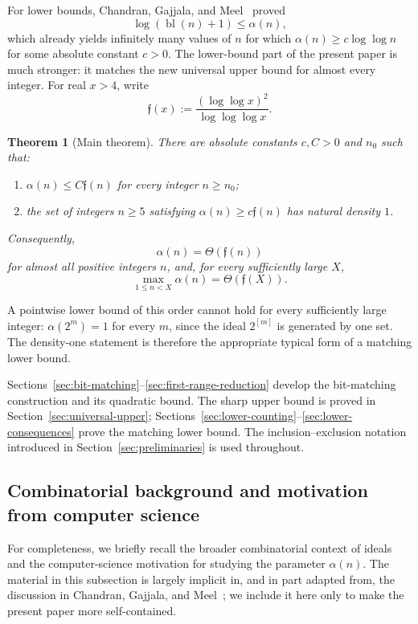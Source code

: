 \documentclass[11pt]{article}
\newtheorem{theorem}{Theorem}[section]
\theoremstyle{definition}
\theoremstyle{remark}
\newcommand{\growth}[1]{\mathfrak f(#1)}
\begin{document}
For lower bounds, Chandran, Gajjala, and Meel~\cite{ChandranGajjalaMeel26} proved
\[
  \log(\operatorname{bl}(n)+1)\le\alpha(n),
\]
which already yields infinitely many values of $n$ for which $\alpha(n)\ge c\log\log n$ for some absolute constant $c>0$.
The lower-bound part of the present paper is much stronger: it matches the new universal upper bound for almost every integer.
For real $x>4$, write
\begin{equation}
  \growth{x}:=\frac{(\log\log x)^2}{\log\log\log x}.
  \label{eq:growth-function}
\end{equation}

\begin{theorem}[Main theorem]\label{thm:main}
There are absolute constants $c,C>0$ and $n_0$ such that:
\begin{enumerate}[label=\textup{(\roman*)}]
  \item $\alpha(n)\le C\growth{n}$ for every integer $n\ge n_0$;
    \item the set of integers $n\ge5$ satisfying $\alpha(n)\ge c\growth{n}$ has natural density $1$.
\end{enumerate}
Consequently,
\[
  \alpha(n)=\Theta(\growth{n})
\]
for almost all positive integers $n$, and, for every sufficiently large $X$,
\[
  \max_{1\le n<X}\alpha(n)=\Theta(\growth{X}).
\]
\end{theorem}

A pointwise lower bound of this order cannot hold for every sufficiently large integer: $\alpha(2^m)=1$ for every $m$, since the ideal $2^{[m]}$ is generated by one set. The density-one statement is therefore the appropriate typical form of a matching lower bound.

Sections~\ref{sec:bit-matching}--\ref{sec:first-range-reduction} develop the bit-matching construction and its quadratic bound. The sharp upper bound is proved in Section~\ref{sec:universal-upper}; Sections~\ref{sec:lower-counting}--\ref{sec:lower-consequences} prove the matching lower bound. The inclusion--exclusion notation introduced in Section~\ref{sec:preliminaries} is used throughout.

\subsection{Combinatorial background and motivation from computer science}

For completeness, we briefly recall the broader combinatorial context of ideals and the computer-science motivation for studying the parameter $\alpha(n)$. The material in this subsection is largely implicit in, and in part adapted from, the discussion in Chandran, Gajjala, and Meel~\cite{ChandranGajjalaMeel26}; we include it here only to make the present paper more self-contained.
\end{document}
